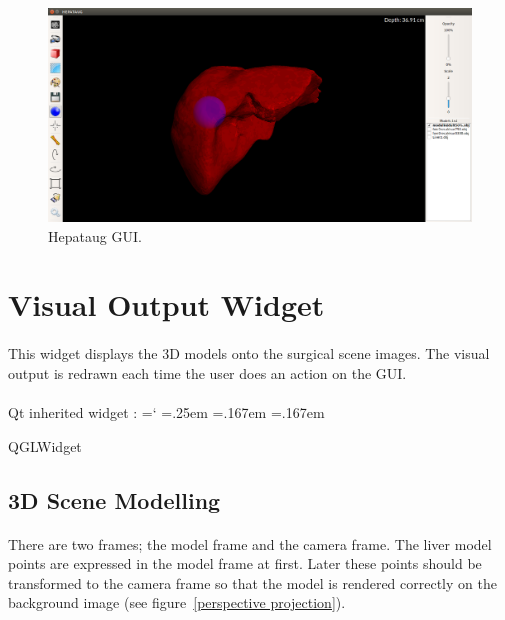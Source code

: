 \documentclass[12pt]{report}
\DeclareRobustCommand*{\ttfamily}{
  \origttfamily
  \hyphenchar\font=`\-\relax
  \fontdimen3\font=.25em\relax
  \fontdimen4\font=.167em\relax
  \fontdimen7\font=.167em\relax
}
\newenvironment{code}{\ttfamily}{}
\begin{document}
\begin{figure}[H]
\centerline{\includegraphics[scale = 0.25]{img/interface.png}}
\caption{Hepataug GUI.}
\label{interface}
\end{figure}



\section{Visual Output Widget}
\paragraph{}
	This widget displays the 3D models onto the surgical scene images. The visual output is redrawn each time the user does an action on the GUI.

\paragraph{}
	Qt inherited widget :
	\begin{code}
	QGLWidget
	\end{code}


\subsection{3D Scene Modelling}
\paragraph{}
	There are two frames; the model frame and the camera frame. The liver model points are expressed in the model frame at first. Later these points should be transformed to the camera frame so that the model is rendered correctly on the background image (see figure~\ref{perspective projection}).
\end{document}
